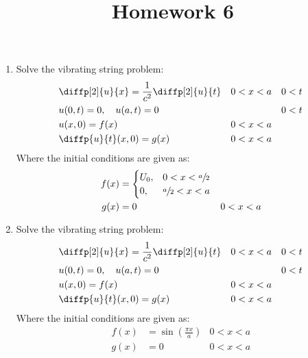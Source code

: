 \documentclass[12pt]{article}
\title{Homework 6}
\begin{document}
\maketitle

\begin{enumerate}
    \item Solve the vibrating string problem:
          \begin{align*}
               & \diffp[2]{u}{x} = \frac{1}{c^{2}} \diffp[2]{u}{t} &  & 0<x<a &  & 0<t \\
               & u(0,t) = 0, \quad u(a,t) = 0                      &  &       &  & 0<t \\
               & u(x,0) = f(x)                                     &  & 0<x<a          \\
               & \diffp{u}{t}(x,0) = g(x)                          &  & 0<x<a
          \end{align*}
          Where the initial conditions are given as:
          \begin{align*}
              f(x) & = \begin{cases}
                           U_{0}, & 0<x<\sfrac{a}{2} \\
                           0,     & \sfrac{a}{2}<x<a
                       \end{cases}          \\
              g(x) & = 0                          & 0<x<a
          \end{align*}
          
    \item Solve the vibrating string problem:
          \begin{align*}
               & \diffp[2]{u}{x} = \frac{1}{c^{2}} \diffp[2]{u}{t} &  & 0<x<a &  & 0<t \\
               & u(0,t) = 0, \quad u(a,t) = 0                      &  &       &  & 0<t \\
               & u(x,0) = f(x)                                     &  & 0<x<a          \\
               & \diffp{u}{t}(x,0) = g(x)                          &  & 0<x<a
          \end{align*}
          Where the initial conditions are given as:
          \begin{align*}
              f(x) & = \sin\left( \frac{\pi x}{a} \right) & 0<x<a \\
              g(x) & = 0                                  & 0<x<a
          \end{align*}

\end{enumerate}
\end{document}

